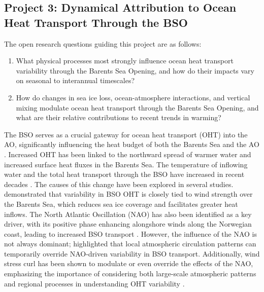 \documentclass[draft]{agujournal2019}
\begin{document}

\subsection{Project 3: Dynamical Attribution to Ocean Heat Transport Through the BSO}

The open research questions guiding this project are as follows:
\begin{enumerate}
    \item What physical processes most strongly influence ocean heat transport variability through the Barents Sea Opening, and how do their impacts vary on seasonal to interannual timescales?
    \item How do changes in sea ice loss, ocean-atmosphere interactions, and vertical mixing modulate ocean heat transport through the Barents Sea Opening, and what are their relative contributions to recent trends in warming?
\end{enumerate}

The BSO serves as a crucial gateway for ocean heat transport (OHT) into the AO, significantly influencing the heat budget of both the Barents Sea \cite{Ingvaldsen2002, Arthun2012} and the AO \cite{Oldenburg2024}. Increased OHT has been linked to the northward spread of warmer water \cite{Smedsrud2010} and increased surface heat fluxes \cite{Smedsrud2013} in the Barents Sea. The temperature of inflowing water and the total heat transport through the BSO have increased in recent decades \cite{muilwijk2018, Wang2019, Arthun2019}. The causes of this change have been explored in several studies.  demonstrated that variability in BSO OHT is closely tied to wind strength over the Barents Sea, which reduces sea ice coverage and facilitates greater heat inflows. The North Atlantic Oscillation (NAO) has also been identified as a key driver, with its positive phase enhancing alongshore winds along the Norwegian coast, leading to increased BSO transport \cite{Ingvaldsen2002}. However, the influence of the NAO is not always dominant;  highlighted that local atmospheric circulation patterns can temporarily override NAO-driven variability in BSO transport. Additionally, wind stress curl has been shown to modulate or even override the effects of the NAO, emphasizing the importance of considering both large-scale atmospheric patterns and regional processes in understanding OHT variability \cite{muilwijk2018}.
\end{document}
